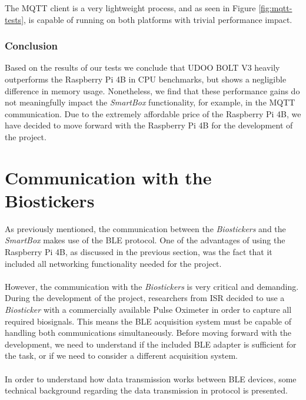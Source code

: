 The \acs{MQTT} client is a very lightweight process, and as seen in Figure \ref{fig:mqtt-tests}, is capable of running on both platforms with trivial performance impact.

\subsubsection{Conclusion}

Based on the results of our tests we conclude that UDOO BOLT V3 heavily outperforms the Raspberry Pi 4B in CPU benchmarks, but shows a negligible difference in memory usage. Nonetheless, we find that these performance gains do not meaningfully impact the \textit{SmartBox} functionality, for example, in the \acs{MQTT} communication. Due to the extremely affordable price of the Raspberry Pi 4B, we have decided to move forward with the Raspberry Pi 4B for the development of the project.

\clearpage

\section{Communication with the Biostickers}

As previously mentioned, the communication between the \textit{Biostickers} and the \textit{SmartBox} makes use of the \acs{BLE} protocol. One of the advantages of using the Raspberry Pi 4B, as discussed in the previous section, was the fact that it included all networking functionality needed for the project. 

\paragraph{} However, the communication with the \textit{Biostickers} is very critical and demanding. During the development of the project, researchers from \acs{ISR} decided to use a \textit{Biosticker} with a commercially available Pulse Oximeter in order to capture all required biosignals. This means the \acs{BLE} acquisition system must be capable of handling both communications simultaneously. Before moving forward with the development, we need to understand if the included \acs{BLE} adapter is sufficient for the task, or if we need to consider a different acquisition system.

\paragraph{} In order to understand how data transmission works between \acs{BLE} devices, some technical background regarding the data transmission in protocol is presented.

